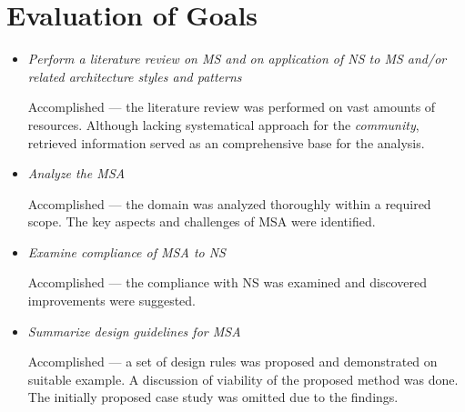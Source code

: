 \documentclass[thesis=M,english,hidelinks]{FITthesis}[2012/10/20]
\begin{document}
\section{Evaluation of Goals}
\begin{itemize}

	\item \textit{Perform a literature review on \acrshort{MS} and on application of \acrshort{NS} to \acrshort{MS} and/or related architecture styles and patterns}
	
	\vspace{0.5em}
	Accomplished --- the literature review was performed on vast amounts of resources. Although lacking systematical approach for the \textit{community}, retrieved information served as an comprehensive base for the analysis.
	
	\item \textit{Analyze the \acrlong{MSA}}
	
	\vspace{0.5em}
    Accomplished --- the domain was analyzed thoroughly within a required scope. The key aspects and challenges of \acrlong{MSA} were identified.

	\item \textit{Examine compliance of \acrlong{MSA} to \acrlong{NS}}

	\vspace{0.5em}	
	Accomplished --- the compliance with \acrlong{NS} was examined and discovered improvements were suggested.

	\item \textit{Summarize design guidelines for \acrshort{MSA}}
	
	\vspace{0.5em}
	Accomplished --- a set of design rules was proposed and demonstrated on suitable example. A discussion of viability of the proposed method was done. The initially proposed case study was omitted due to the findings.

\end{itemize}




\end{document}
